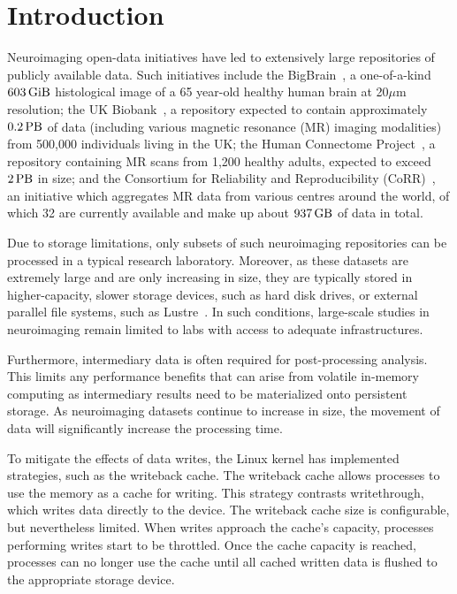 \documentclass[conference]{IEEEtran}
\newcommand{\bigbrain}{BigBrain\xspace}
\begin{document}
\section{Introduction}
Neuroimaging open-data initiatives have led to extensively large repositories of
publicly available data. Such initiatives include the \bigbrain~\cite{BigBrain}, 
a one-of-a-kind $\SI{603}{\gibi\byte}$
histological image of a 65 year-old healthy human brain
at 20$\mu$m resolution; the UK Biobank~\cite{ukbiobank}, a repository expected to
contain approximately $\SI{0.2}{\peta\byte}$ of data (including various magnetic
resonance (MR) imaging modalities) from 500,000 individuals living in the UK;
the Human Connectome Project~\cite{HCP}, a repository containing MR scans from
1,200 healthy adults, expected to exceed $\SI{2}{\peta\byte}$ in size; 
and the Consortium for Reliability and Reproducibility (CoRR)~\cite{corr}, an
initiative which aggregates MR data from various centres around the world, 
of which 32 are currently available and make up about $\SI{937}{\giga\byte}$ of
data in total.

Due to storage limitations, only subsets of such neuroimaging repositories 
can be processed in a typical research laboratory. Moreover, as these datasets 
are extremely large and are only increasing in size, they are typically stored 
in higher-capacity, slower storage devices, such as hard disk drives, or external
parallel file systems, such as Lustre~\cite{lustre}. In such conditions, large-scale 
studies in neuroimaging remain limited to labs with access to adequate 
infrastructures.

Furthermore, intermediary data is often required for post-processing analysis. This limits
any performance benefits that can arise from volatile in-memory computing as intermediary
results need to be materialized onto persistent storage. As neuroimaging datasets continue
to increase in size, the movement of data will significantly increase the processing time.

To mitigate the effects of data writes, the Linux kernel has implemented
strategies, such as the writeback cache. The writeback cache
allows processes to use the memory as a cache for writing. This strategy contrasts writethrough, which 
writes data directly to the device. The writeback cache size
is configurable, but nevertheless limited. When writes approach the cache's capacity,
processes performing writes start to be throttled. Once the cache capacity is reached,
processes can no longer use the cache until all cached written data is flushed
to the appropriate storage device.
\end{document}
